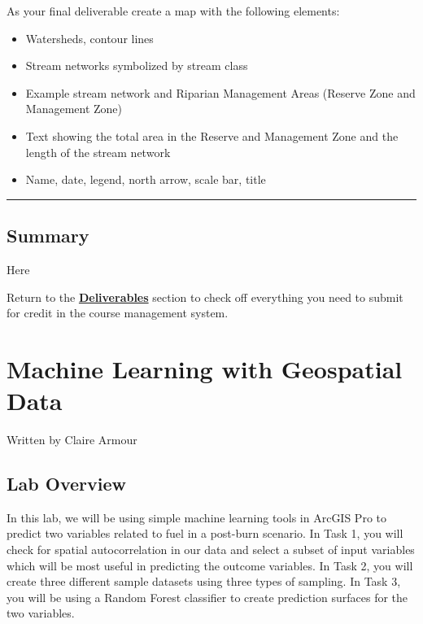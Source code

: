 \documentclass[
]{book}
\providecommand{\tightlist}{%
  \setlength{\itemsep}{0pt}\setlength{\parskip}{0pt}}
\begin{document}
As your final deliverable create a map with the following elements:

\begin{itemize}
\tightlist
\item
  Watersheds, contour lines
\item
  Stream networks symbolized by stream class
\item
  Example stream network and Riparian Management Areas (Reserve Zone and Management Zone)
\item
  Text showing the total area in the Reserve and Management Zone and the length of the stream network
\item
  Name, date, legend, north arrow, scale bar, title
\end{itemize}

\begin{center}\rule{0.5\linewidth}{0.5pt}\end{center}

\hypertarget{summary-2}{%
\section*{Summary}\label{summary-2}}

Here

Return to the \protect\hyperlink{lab3-deliverables}{\textbf{Deliverables}} section to check off everything you need to submit for credit in the course management system.

\hypertarget{machine-learning}{%
\chapter{Machine Learning with Geospatial Data}\label{machine-learning}}

Written by
Claire Armour

\hypertarget{lab-overview-3}{%
\section*{Lab Overview}\label{lab-overview-3}}

In this lab, we will be using simple machine learning tools in ArcGIS Pro to predict two variables related to fuel in a post-burn scenario. In Task 1, you will check for spatial autocorrelation in our data and select a subset of input variables which will be most useful in predicting the outcome variables. In Task 2, you will create three different sample datasets using three types of sampling. In Task 3, you will be using a Random Forest classifier to create prediction surfaces for the two variables.
\end{document}
